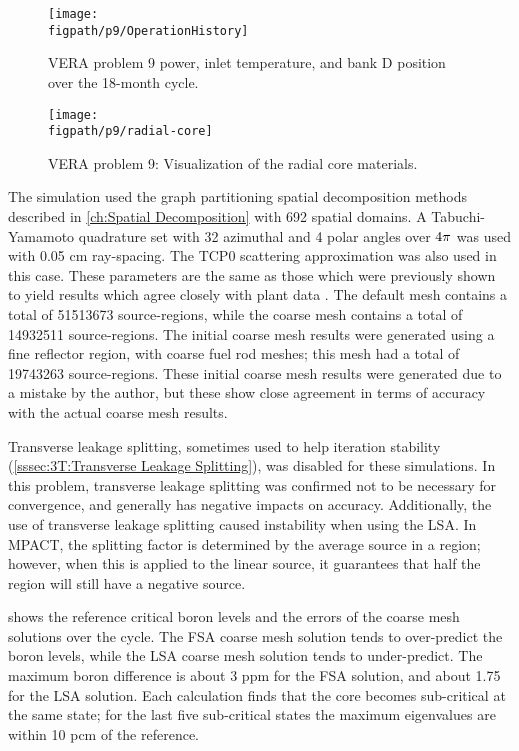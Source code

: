 {{{      \begin{figure}[h]
        \centering
        \texttt{[image: \\figpath/p9/OperationHistory]}
        \caption{VERA problem 9 power, inlet temperature, and bank D position over the 18-month cycle. \label{fig:LSMOC:P9:Operation}}
      \end{figure}

      \begin{figure}[h]
        \centering
        \texttt{[image: \\figpath/p9/radial-core]}
        \caption{VERA problem 9: Visualization of the radial core materials. \label{fig:LSMOC:P9:Radial Core}}
      \end{figure}

      The simulation used the graph partitioning spatial decomposition methods described in \cref{ch:Spatial Decomposition} with 692 spatial domains.
      A Tabuchi-Yamamoto quadrature set with 32 azimuthal and 4 polar angles over $4\pi$ was used with 0.05 cm ray-spacing.
      The TCP0 scattering approximation was also used in this case.
      These parameters are the same as those which were previously shown to yield results which agree closely with plant data \cite{VERA}.
      The default mesh contains a total of 51513673 source-regions, while the coarse mesh contains a total of 14932511 source-regions. %
      The initial coarse mesh results were generated using a fine reflector region, with coarse fuel rod meshes; this mesh had a total of 19743263 source-regions.
      These initial coarse mesh results were generated due to a mistake by the author, but these show close agreement in terms of accuracy with the actual coarse mesh results.

      Transverse leakage splitting, sometimes used to help iteration stability (\cref{sssec:3T:Transverse Leakage Splitting}), was disabled for these simulations.
      In this problem, transverse leakage splitting was confirmed not to be necessary for convergence, and generally has negative impacts on accuracy.
      Additionally, the use of transverse leakage splitting caused instability when using the \ac{LSA}.
      In MPACT, the splitting factor is determined by the average source in a region; however, when this is applied to the linear source, it guarantees that half the region will still have a negative source.

       shows the reference critical boron levels and the errors of the coarse mesh solutions over the cycle.
      The \ac{FSA} coarse mesh solution tends to over-predict the boron levels, while the \ac{LSA} coarse mesh solution tends to under-predict.
      The maximum boron difference is about 3 ppm for the \ac{FSA} solution, and about 1.75 for the \ac{LSA} solution.
      Each calculation finds that the core becomes sub-critical at the same state; for the last five sub-critical states the maximum eigenvalues are within 10 pcm of the reference.

}}}
